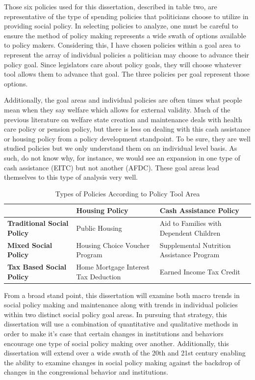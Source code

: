 \documentclass[12pt]{article}
\begin{document}
Those six policies used for this dissertation, described in table two, are representative of the type of spending policies that politicians choose to utilize in providing social policy. In selecting policies to analyze, one must be careful to ensure the method of policy making represents a wide swath of options available to policy makers. Considering this, I have chosen policies within a goal area to represent the array of individual policies a politician may choose to advance their policy goal. Since legislators care about policy goals, they will choose whatever tool allows them to advance that goal. The three policies per goal represent those options. 

Additionally, the goal areas and individual policies are often times what people mean when they say welfare which allows for external validity. Much of the previous literature on welfare state creation and maintenance deals with health care policy or pension policy, but there is less on dealing with this cash assistance or housing policy from a policy development standpoint. To be sure, they are well studied policies but we only understand them on an individual level basis. As such, do not know why, for instance, we would see an expansion in one type of cash assistance (EITC) but not another (AFDC). These goal areas lead themselves to this type of analysis very well.

\begin{table}
\centering
    \begin{tabularx}{\textwidth}{XXX} \toprule
           & \textbf{Housing Policy} & \textbf{Cash Assistance Policy} \\ \midrule
    \textbf{Traditional Social Policy} & Public Housing        & Aid to Families with Dependent Children \\
        \textbf{Mixed Social Policy} & Housing Choice Voucher Program        & Supplemental Nutrition Assistance Program \\
    \textbf{Tax Based Social Policy} & Home Mortgage Interest Tax Deduction        & Earned Income Tax Credit \\ \bottomrule
    \end{tabularx}
  \caption{Types of Policies According to Policy Tool Area}
  \label{tab:types}
\end{table}

From a broad stand point, this dissertation will examine both macro trends in social policy making and maintenance along with trends in individual policies within two distinct social policy goal areas. In pursuing that strategy, this dissertation will use a combination of quantitative and qualitative methods in order to make it's case that certain changes in institutions and behaviors encourage one type of social policy making over another. Additionally, this dissertation will extend over a wide swath of the 20th and 21st century enabling the ability to examine changes in social policy making against the backdrop of changes in the congressional behavior and institutions.
\end{document}
